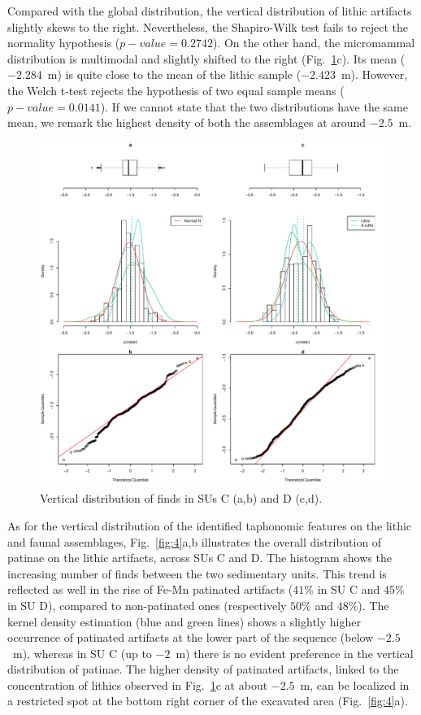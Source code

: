 \documentclass[review,authoryear]{elsarticle} %
\begin{document}
Compared with the global distribution, the vertical distribution of lithic artifacts slightly skews to the right. Nevertheless, the Shapiro-Wilk test fails to reject the normality hypothesis ($p-value=0.2742$). On the other hand, the micromammal distribution is multimodal and slightly shifted to the right (Fig.~\ref{fig:3}c). Its mean ($-2.284$~m) is quite close to the mean of the lithic sample ($-2.423$~m). However, the Welch t-test rejects the hypothesis of two equal sample means ($p-value=0.0141$). If we cannot state that the two distributions have the same mean, we remark the highest density of both the assemblages at around $-2.5$~m.

\begin{figure}
  \centering
  \includegraphics[width=1\textwidth]{../artwork/Fig3.pdf}
  \caption{Vertical distribution of finds in SUs C (a,b) and D (c,d).}
  \label{fig:3}
\end{figure}

As for the vertical distribution of the identified taphonomic features on the lithic and faunal assemblages, Fig.~\ref{fig:4}a,b illustrates the overall distribution of patinae on the lithic artifacts, across SUs C and D. The histogram shows the increasing number of finds between the two sedimentary units. This trend is reflected as well in the rise of Fe-Mn patinated artifacts ($41\%$ in SU C and $45\%$ in SU D), compared to non-patinated ones (respectively $50\%$ and $48\%$). The kernel density estimation (blue and green lines) shows a slightly higher occurrence of patinated artifacts at the lower part of the sequence (below $-2.5$~m), whereas in SU C (up to $-2$~m) there is no evident preference in the vertical distribution of patinae. The higher density of patinated artifacts, linked to the concentration of lithics observed in Fig.~\ref{fig:3}c at about $-2.5$~m, can be localized in a restricted spot at the bottom right corner of the excavated area (Fig.~\ref{fig:4}a).
\end{document}
